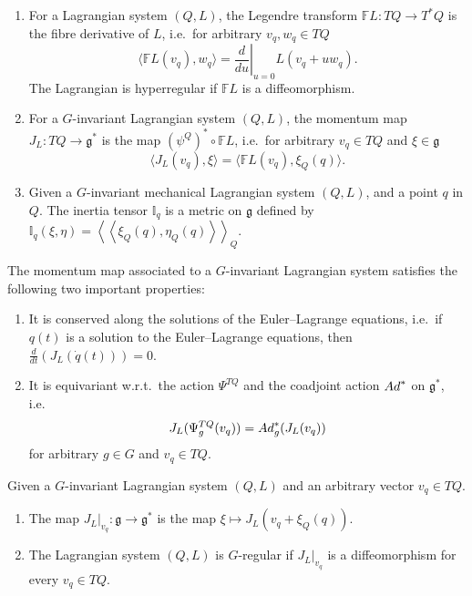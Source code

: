 \documentclass[11pt]{article}
\renewcommand{\ll}{\left<\!\left<}
\renewcommand{\gg}{\right>\!\right>}
\newcommand{\lag}{\mathfrak{g}}
\newcommand{\F}{\mathbb{F}}
\begin{document}
\begin{definition}\mbox{}
\begin{enumerate}\itemsep=0pt
\item For a Lagrangian system $(Q,L)$, the Legendre transform $\F L:TQ\to T^*Q$ is the f\/ibre derivative of $L$, i.e.\ for arbitrary $v_q,w_q\in TQ$
\[\langle \F L(v_q), w_q\rangle  = \left.\frac{d}{du}\right|_{u=0} L(v_q+u w_q).\]
The Lagrangian is hyperregular if $\F L$ is a dif\/feomorphism.
\item For a $G$-invariant Lagrangian system $(Q,L)$, the momentum map $J_L : TQ\to \lag^*$ is the map $(\psi^Q)^*\circ \F L$, i.e.\ for arbitrary  $v_q\in TQ$ and $\xi \in \lag$
\[\langle J_L(v_q),\xi\rangle = \langle \F L(v_q) , \xi_{Q}(q)\rangle.\]
\item Given a $G$-invariant mechanical Lagrangian system $(Q,L)$, and a point $q$ in $Q$. The inertia tensor $\mathbb{I}_q$ is a metric on $\lag$ def\/ined by $\mathbb{I}_q(\xi,\eta)= \ll \xi_Q(q),\eta_Q(q)\gg_Q$.
\end{enumerate}
\end{definition}
The momentum map associated to a $G$-invariant Lagrangian system satisf\/ies the following two important properties:
\begin{enumerate}\itemsep=0pt \item It is conserved along the solutions of the Euler--Lagrange equations, i.e.\ if $q(t)$ is a solution to the Euler--Lagrange equations, then $\frac{d}{dt} \left(J_L(\dot q(t))\right)=0$.
\item It is equivariant w.r.t.\ the action $\Psi^{TQ}$ and the coadjoint action ${\rm Ad}^*$ on $\lag^*$, i.e.\ \[J_L(\Psi^{TQ}_g(v_q)) = {\rm Ad}^*_g(J_L(v_q))\] for arbitrary $g\in G$ and $v_q\in TQ$.
\end{enumerate}

\begin{definition} Given a $G$-invariant Lagrangian system $(Q,L)$ and an arbitrary vector $v_q\in TQ$.{\samepage
\begin{enumerate}\itemsep=0pt
\item The map $J_L|_{v_q}: \lag \to \lag^*$ is the map $\xi \mapsto J_L(v_q+\xi_Q(q))$.
\item The Lagrangian system $(Q,L)$ is  $G$-regular if $J_L|_{v_q}$ is a dif\/feomorphism for every $v_q\in TQ$.
\end{enumerate}}
\end{definition}
\end{document}
